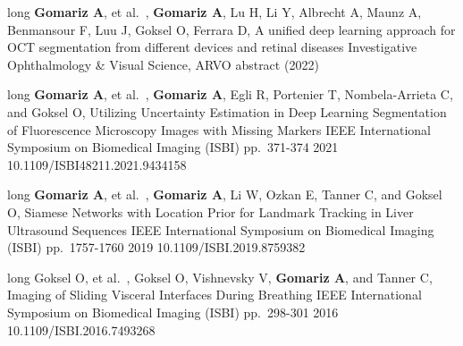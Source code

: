\begin{cvpublications}
\cvpublication
{long}
{
    {\textbf{Gomariz A}, et al.~,}
    {\textbf{Gomariz A}, Lu H, Li Y, Albrecht A, Maunz A, Benmansour F, Luu J, Goksel O, Ferrara D,}
}
{A unified deep learning approach for OCT segmentation from different devices and retinal diseases}
{Investigative Ophthalmology \& Visual Science, ARVO abstract}
{(2022)}
{}
{}

\cvpublication
{long}
{
    {\textbf{Gomariz A}, et al.~,}
    {\textbf{Gomariz A}, Egli R, Portenier T, Nombela-Arrieta C, and Goksel O,}
}
{Utilizing Uncertainty Estimation in Deep Learning Segmentation of Fluorescence Microscopy Images with Missing Markers}
{IEEE International Symposium on Biomedical Imaging (ISBI)}
{pp.\ 371-374}
{2021}
{10.1109/ISBI48211.2021.9434158}

\cvpublication
{long}
{
    {\textbf{Gomariz A}, et al.~,}
    {\textbf{Gomariz A}, Li W, Ozkan E, Tanner C, and Goksel O,}
}
{Siamese Networks with Location Prior for Landmark Tracking in Liver Ultrasound Sequences}
{IEEE International Symposium on Biomedical Imaging (ISBI)}
{pp.\ 1757-1760}
{2019}
{10.1109/ISBI.2019.8759382}

\cvpublication
{long}
{
    {Goksel O, et al.~,}
    {Goksel O, Vishnevsky V, \textbf{Gomariz A}, and Tanner C,}
}
{Imaging of Sliding Visceral Interfaces During Breathing}
{IEEE International Symposium on Biomedical Imaging (ISBI)}
{pp.\ 298-301}
{2016}
{10.1109/ISBI.2016.7493268}

\end{cvpublications}






